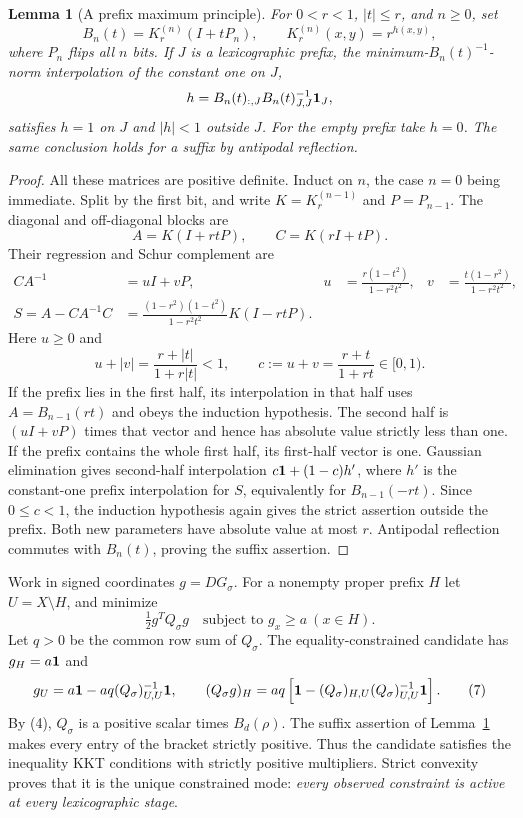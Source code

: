 \documentclass[11pt]{article}
\newtheorem{lemma}[theorem]{Lemma}
\begin{document}
\begin{lemma}[A prefix maximum principle]\label{lem:prefix}
For $0<r<1$, $|t|\le r$, and $n\ge0$, set
\[
 B_n(t)=K_r^{(n)}(I+tP_n),\qquad
 K_r^{(n)}(x,y)=r^{h(x,y)},
\]
where $P_n$ flips all $n$ bits. If $J$ is a lexicographic prefix,
the minimum-$B_n(t)^{-1}$-norm interpolation of the constant one on $J$,
\[
 h=B_n(t)_{:,J}B_n(t)_{J,J}^{-1}\mathbf1_J,
\]
satisfies $h=1$ on $J$ and $|h|<1$ outside $J$.
For the empty prefix take $h=0$.
The same conclusion holds for a suffix by antipodal reflection.
\end{lemma}
\begin{proof}
All these matrices are positive definite. Induct on $n$, the case
$n=0$ being immediate. Split by the first bit, and write $K=K_r^{(n-1)}$
and $P=P_{n-1}$. The diagonal and off-diagonal blocks are
\[
 A=K(I+rtP),\qquad C=K(rI+tP).
\]
Their regression and Schur complement are
\begin{align*}
 CA^{-1}&=uI+vP,
 &u&=\frac{r(1-t^2)}{1-r^2t^2},
 &v&=\frac{t(1-r^2)}{1-r^2t^2},\\
 S=A-CA^{-1}C
 &=\frac{(1-r^2)(1-t^2)}{1-r^2t^2}K(I-rtP).
\end{align*}
Here $u\ge0$ and
\[
 u+|v|=\frac{r+|t|}{1+r|t|}<1,\qquad
 c:=u+v=\frac{r+t}{1+rt}\in[0,1).
\]
If the prefix lies in the first half, its interpolation in that half
uses $A=B_{n-1}(rt)$ and obeys the induction hypothesis. The second
half is $(uI+vP)$ times that vector and hence has absolute value
strictly less than one.
If the prefix contains the whole first half, its first-half vector
is one. Gaussian elimination gives second-half interpolation
$c\mathbf1+(1-c)h'$, where $h'$ is the constant-one prefix interpolation
for $S$, equivalently for $B_{n-1}(-rt)$. Since $0\le c<1$, the induction
hypothesis again gives the strict assertion outside the prefix.
Both new parameters have absolute value at most $r$. Antipodal
reflection commutes with $B_n(t)$, proving the suffix assertion.
\end{proof}

Work in signed coordinates $g=DG_\sigma$.
For a nonempty proper prefix $H$ let $U=X\setminus H$, and minimize
\[
             \tfrac12g^TQ_\sigma g
                 \quad\text{subject to }g_x\ge a\ (x\in H).      \tag{6}
\]
Let $q>0$ be the common row sum of $Q_\sigma$.
The equality-constrained candidate has $g_H=a\mathbf1$ and
\[
 g_U=a\mathbf1-aq(Q_\sigma)_{U,U}^{-1}\mathbf1,
 \qquad
 (Q_\sigma g)_H=aq\left[\mathbf1-
       (Q_\sigma)_{H,U}(Q_\sigma)_{U,U}^{-1}\mathbf1\right].          \tag{7}
\]
By (4), $Q_\sigma$ is a positive scalar times $B_d(\rho)$.
The suffix assertion of Lemma~\ref{lem:prefix} makes every entry of
the bracket strictly positive. Thus the candidate satisfies the
inequality KKT conditions with strictly positive multipliers.
Strict convexity proves that it is the unique constrained mode:
\emph{every observed constraint is active at every lexicographic stage}.
\end{document}
